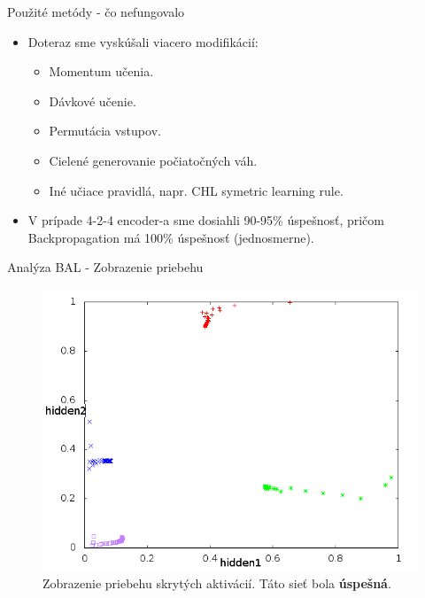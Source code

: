 \documentclass[xcolor=dvipsnames]{beamer}
\begin{document}
\begin{frame}{Použité metódy - čo nefungovalo}
  \begin{itemize}
    \item Doteraz sme vyskúšali viacero modifikácií: 
    \begin{itemize} 
      \item Momentum učenia.
      \item Dávkové učenie. 
      \item Permutácia vstupov. 
      \item Cielené generovanie počiatočných váh. 
      \item Iné učiace pravidlá, napr. CHL symetric learning rule.
    \end{itemize} 
    \item V prípade 4-2-4 encoder-a sme dosiahli 90-95\% úspešnosť, pričom Backpropagation má 100\% úspešnosť (jednosmerne). 
  \end{itemize} 
\end{frame} 

\begin{frame}{Analýza BAL - Zobrazenie priebehu}
  \begin{figure}[h!]  
    \centering
    \includegraphics[scale=0.4]{img/nice.png}
    \caption{{\tiny Zobrazenie priebehu skrytých aktivácií. Táto sieť bola {\bf úspešná}.}} 
  \end{figure} 
\end{frame} 
\end{document}
